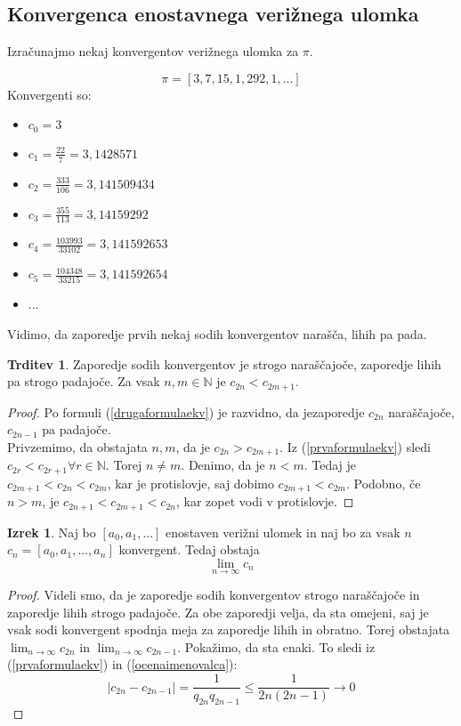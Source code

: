 \documentclass[a4paper,12pt]{article}
\newcommand{\N}{\mathbb{N}}
\theoremstyle{definition}
\theoremstyle{proposition}
\newtheorem{trd}{Trditev}[section]
\theoremstyle{theorem}
\newtheorem{iz}{Izrek}[section]
\theoremstyle{lemma}
\begin{document}
\subsection{Konvergenca enostavnega verižnega ulomka} \label{konvca}

Izračunajmo nekaj konvergentov verižnega ulomka za $\pi$.

\[ \pi = [3, 7, 15, 1, 292, 1, ...] \]
Konvergenti so:
	\begin{itemize}
	\item $c_0 = 3$
	\item $c_1 = \frac{22}{7} = 3,1428571$
	\item $c_2 = \frac{333}{106} = 3,141509434$
	\item $c_3 = \frac{355}{113} = 3,14159292$
	\item $c_4 = \frac{103993}{33102} = 3,141592653$
	\item $c_5 = \frac{104348}{33215} = 3,141592654$
	\item ...
	\end{itemize}
	
Vidimo, da zaporedje prvih nekaj sodih konvergentov narašča, lihih pa pada.

\begin{trd}
\label{podzaporedji}
Zaporedje sodih konvergentov je strogo naraščajoče, zaporedje lihih pa strogo padajoče. Za vsak $n, m \in \N$ je  $c_{2n} < c_{2m+1}$.
\end{trd}
\begin{proof}
Po formuli (\ref{drugaformulaekv}) je razvidno, da jezaporedje $c_{2n}$ naraščajoče, $c_{2n-1}$ pa padajoče. \\
Privzemimo, da obstajata $n, m$, da je $c_{2n} > c_{2m+1}$. Iz (\ref{prvaformulaekv}) sledi $c_{2r} < c_{2r+1} \forall r \in \N$. Torej $ n \neq m$. Denimo, da je $n < m$. Tedaj je $c_{2m+1} < c_{2n} < c_{2m}$, kar je protislovje, saj dobimo $c_{2m+1} < c_{2m}$. Podobno, če $n > m$, je $c_{2n+1} < c_{2m+1} < c_{2n}$, kar zopet vodi v protislovje.
\end{proof}

\begin{iz}
\label{konvergenca}
Naj bo $[a_0, a_1, ...]$ enostaven verižni ulomek in naj bo za vsak $n$ $c_n = [a_0, a_1, ..., a_n]$ konvergent. Tedaj obstaja $$\lim_{n\to\infty}c_n$$
\end{iz}

\begin{proof}
Videli smo, da je zaporedje sodih konvergentov strogo naraščajoče in zaporedje lihih strogo padajoče. Za obe zaporedji velja, da sta omejeni, saj je vsak sodi konvergent spodnja meja za zaporedje lihih in obratno. Torej obstajata $\lim_{n\to\infty}c_{2n}$ in $\lim_{n\to\infty}c_{2n-1}$. Pokažimo, da sta enaki. To sledi iz (\ref{prvaformulaekv}) in (\ref{ocenaimenovalca}):
\[ \left|c_{2n} - c_{2n-1}\right| = \frac{1}{q_{2n} q_{2n-1}} \leq \frac{1}{2n(2n-1)} \longrightarrow 0 \]
\end{proof}
\end{document}
